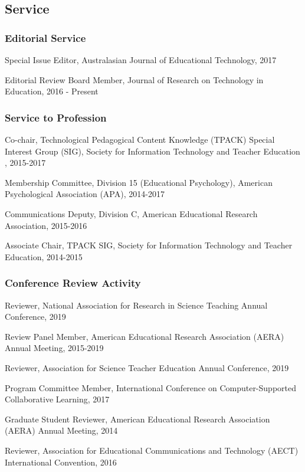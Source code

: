 \documentclass[]{article}
\begin{document}
\subsection{Service}\label{service}

\subsubsection{Editorial Service}\label{editorial-service}

Special Issue Editor, Australasian Journal of Educational Technology,
2017

Editorial Review Board Member, Journal of Research on Technology in
Education, 2016 - Present

\subsubsection{Service to Profession}\label{service-to-profession}

Co-chair, Technological Pedagogical Content Knowledge (TPACK) Special
Interest Group (SIG), Society for Information Technology and Teacher
Education , 2015-2017

Membership Committee, Division 15 (Educational Psychology), American
Psychological Association (APA), 2014-2017

Communications Deputy, Division C, American Educational Research
Association, 2015-2016

Associate Chair, TPACK SIG, Society for Information Technology and
Teacher Education, 2014-2015

\subsubsection{Conference Review
Activity}\label{conference-review-activity}

Reviewer, National Association for Research in Science Teaching Annual
Conference, 2019

Review Panel Member, American Educational Research Association (AERA)
Annual Meeting, 2015-2019

Reviewer, Association for Science Teacher Education Annual Conference,
2019

Program Committee Member, International Conference on Computer-Supported
Collaborative Learning, 2017

Graduate Student Reviewer, American Educational Research Association
(AERA) Annual Meeting, 2014

Reviewer, Association for Educational Communications and Technology
(AECT) International Convention, 2016
\end{document}
